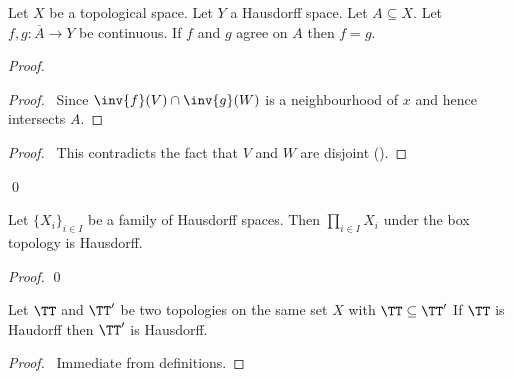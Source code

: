 \begin{proposition}
    \label{proposition:agree_on_closure}
    Let $X$ be a topological space. Let $Y$ a Hausdorff space. Let $A \subseteq X$. Let $f, g : \overline{A} \rightarrow Y$ be continuous.
    If $f$ and $g$ agree on $A$ then $f = g$.
\end{proposition}

\begin{proof}
    \pf
    \begin{proof}
        \pf\ Since $\inv{f}(V) \cap \inv{g}(W)$ is a neighbourhood of $x$ and hence intersects $A$.
    \end{proof}
    \qedstep
    \begin{proof}
        \pf\ This contradicts the fact that $V$ and $W$ are disjoint ().
    \end{proof}
    \qed
\end{proof}

\begin{proposition}
    Let $\{ X_i \}_{i \in I}$ be a family of Hausdorff spaces. Then $\prod_{i \in I} X_i$ under the box topology is Hausdorff.
\end{proposition}

\begin{proof}
    \pf
    \qed
\end{proof}

\begin{proposition}
    \label{proposition:Hausdorff_finer}
    Let $\TT$ and $\TT'$ be two topologies on the same set $X$ with $\TT \subseteq \TT'$
    If $\TT$ is Haudorff then $\TT'$ is Hausdorff.
\end{proposition}

\begin{proof}
    \pf\ Immediate from definitions.
\end{proof}

